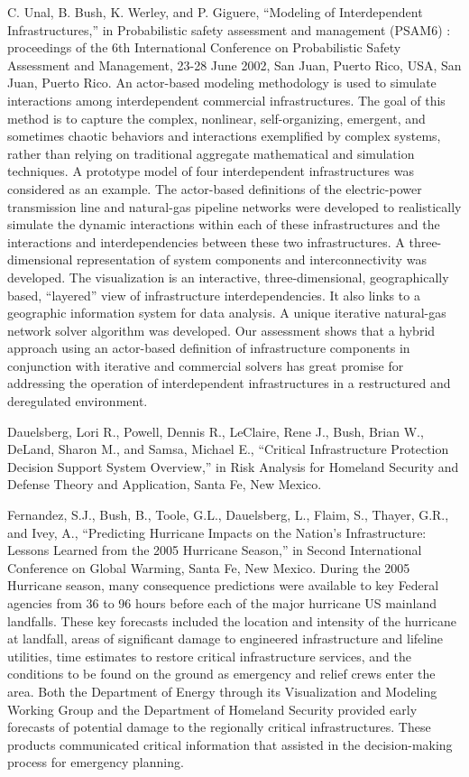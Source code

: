 \documentclass[]{article}
\begin{document}
C. Unal, B. Bush, K. Werley, and P. Giguere, ``Modeling of
Interdependent Infrastructures,'' in Probabilistic safety assessment and
management (PSAM6) : proceedings of the 6th International Conference on
Probabilistic Safety Assessment and Management, 23-28 June 2002, San
Juan, Puerto Rico, USA, San Juan, Puerto Rico. An actor-based modeling
methodology is used to simulate interactions among interdependent
commercial infrastructures. The goal of this method is to capture the
complex, nonlinear, self-organizing, emergent, and sometimes chaotic
behaviors and interactions exemplified by complex systems, rather than
relying on traditional aggregate mathematical and simulation techniques.
A prototype model of four interdependent infrastructures was considered
as an example. The actor-based definitions of the electric-power
transmission line and natural-gas pipeline networks were developed to
realistically simulate the dynamic interactions within each of these
infrastructures and the interactions and interdependencies between these
two infrastructures. A three-dimensional representation of system
components and interconnectivity was developed. The visualization is an
interactive, three-dimensional, geographically based, ``layered'' view
of infrastructure interdependencies. It also links to a geographic
information system for data analysis. A unique iterative natural-gas
network solver algorithm was developed. Our assessment shows that a
hybrid approach using an actor-based definition of infrastructure
components in conjunction with iterative and commercial solvers has
great promise for addressing the operation of interdependent
infrastructures in a restructured and deregulated environment.

Dauelsberg, Lori R., Powell, Dennis R., LeClaire, Rene J., Bush, Brian
W., DeLand, Sharon M., and Samsa, Michael E., ``Critical Infrastructure
Protection Decision Support System Overview,'' in Risk Analysis for
Homeland Security and Defense Theory and Application, Santa Fe, New
Mexico.

Fernandez, S.J., Bush, B., Toole, G.L., Dauelsberg, L., Flaim, S.,
Thayer, G.R., and Ivey, A., ``Predicting Hurricane Impacts on the
Nation's Infrastructure: Lessons Learned from the 2005 Hurricane
Season,'' in Second International Conference on Global Warming, Santa
Fe, New Mexico. During the 2005 Hurricane season, many consequence
predictions were available to key Federal agencies from 36 to 96 hours
before each of the major hurricane US mainland landfalls. These key
forecasts included the location and intensity of the hurricane at
landfall, areas of significant damage to engineered infrastructure and
lifeline utilities, time estimates to restore critical infrastructure
services, and the conditions to be found on the ground as emergency and
relief crews enter the area. Both the Department of Energy through its
Visualization and Modeling Working Group and the Department of Homeland
Security provided early forecasts of potential damage to the regionally
critical infrastructures. These products communicated critical
information that assisted in the decision-making process for emergency
planning.
\end{document}
